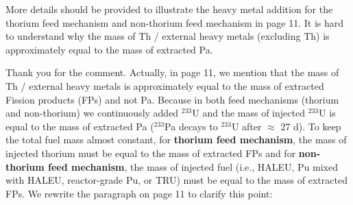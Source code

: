 \documentclass[answers,11pt]{exam}
\begin{document}
\begin{questions}
        \question More details should be provided to illustrate the heavy metal addition for the thorium feed mechanism and non-thorium feed mechanism in page 11. It is hard to understand why the mass of Th / external heavy metals (excluding Th) is approximately equal to the mass of extracted Pa.
        \begin{solution}
               Thank you for the comment. Actually, in page 11, we mention 
               that the mass of Th / external heavy metals is approximately 
               equal to the mass of extracted Fission products (FPs) and not 
               Pa. Because in both feed mechanisms (thorium and non-thorium) 
               we continuously added $^{233}$U and the mass of injected 
               $^{233}$U is equal to the mass of extracted Pa ($^{233}$Pa 
               decays to $^{233}$U after $\approx$ 27 d). To keep the total 
               fuel mass almost constant, for \textbf{thorium feed mechanism}, 
               the mass of injected thorium must be equal to the mass of 
               extracted FPs and for \textbf{non-thorium feed mechanism}, the 
               mass of injected fuel (i.e., HALEU, Pu mixed with HALEU, 
               reactor-grade Pu, or TRU) must be equal to the mass of 
               extracted FPs. We rewrite the paragraph on page 11 to clarify 
               this point:\\
               

\end{solution}
\end{questions}
\end{document}
